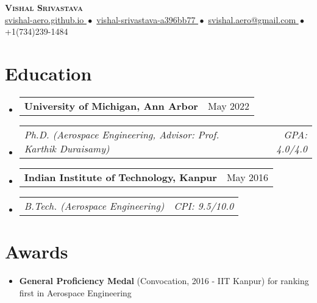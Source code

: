 \documentclass[letterpaper, 11pt]{article}
\makeatletter
\newcommand{\resumeItem}[1]{
  \item\small{{#1\vspace{-2pt}}}
}
\newcommand{\resumeStint}[2]{
  \vspace{-2pt}\item
    \begin{tabular*}{0.97\textwidth}[t]{@{}l@{\extracolsep{\fill}}r}
    \textbf{\small #1} & {\small #2}
  \end{tabular*}\vspace{-7pt}
}
\newcommand{\resumeSubstint}[2]{
  \vspace{-16pt}\item
    \begin{tabular*}{0.97\textwidth}[t]{@{}l@{\extracolsep{\fill}}r}
    {\textit{\small#1}}&{\textit{\small#2}}
  \end{tabular*}%
}
\newcommand{\resumeSubHeadingListStart}{\begin{itemize}[leftmargin=0.15in, label={}]}
\newcommand{\resumeSubHeadingListEnd}{\end{itemize}}
\makeatother
\begin{document}

  \vspace*{0.25in}


  \begin{center}
    \textbf{\Huge\scshape Vishal Srivastava}\\
    \vspace{8pt}\small
    \href{https://svishal-aero.github.io}{
      svishal-aero.github.io
    }${ }{ }\bullet{ }{ }$
    \href{https://linkedin.com/in/vishal-srivastava-a396bb77/}{
      vishal-srivastava-a396bb77
    }${ }{ }\bullet{ }{ }$
    \href{mailto:svishal.aero@gmail.com}{
      svishal.aero@gmail.com
    }${ }{ }\bullet{ }{ }$
    +1$ $(734)$ $239-1484
  \end{center}


  \section{Education}
  \resumeSubHeadingListStart
    \resumeStint
    {University of Michigan, Ann Arbor}{May 2022}
    \resumeSubstint
    {Ph.D. (Aerospace Engineering, Advisor: Prof. Karthik Duraisamy)}{GPA: 4.0/4.0}
    \vspace{3pt}
    \resumeStint
    {Indian Institute of Technology, Kanpur}{May 2016}
    \resumeSubstint
    {B.Tech. (Aerospace Engineering)}{CPI: 9.5/10.0}
  \resumeSubHeadingListEnd


  \section{Awards}
  \resumeSubHeadingListStart
    \resumeItem{
      \textbf{General Proficiency Medal} (Convocation, 2016 - IIT Kanpur) for ranking first in
      Aerospace Engineering
    }
  \resumeSubHeadingListEnd

\end{document}
